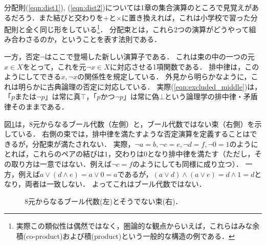 \documentclass[11pt,a4paper, dvipdfmx]{jsarticle}
\begin{document}
分配則(\ref{eqn:dist1}), (\ref{eqn:dist2})については1章の集合演算のところで見覚えがあるだろう．また結びと交わりを$+$と$\times$に置き換えれば，これは小学校で習った分配則と全く同じ形をしている\footnote{実際この類似性は偶然ではなく，圏論的な観点からいえば，これらはみな余積(co-product)および積(product)という一般的な構造の例である．}．
分配束とは，これら2つの演算がどうやって組み合わさるのか，ということを表す法則である．

一方，否定$\neg$はここで登場した新しい演算子である．
これは束の中の一つの元$x \in X$をとって，これを元$\neg x \in X$に対応させる1項関数である．
排中律は，このようにしてできる$x, \neg x$の関係性を規定している．
外見から明らかなように，これは明らかに古典論理の否定に対応している．
実際(\ref{eqn:excluded_middle})は，「$p$または$\neg p$」は常に真$\top$，「$p$かつ$\neg p$」は常に偽$\bot$という論理学の排中律・矛盾律そのままである．


図\ref{fig:8bool}は，8元からなるブール代数（左側）と，ブール代数ではない束（右側）を示している．
右側の束では，排中律を満たすような否定演算を定義することはできるが，分配束が満たされない．
実際，$\neg a = b, \neg c = e, \neg d =f, \neg 0 = 1$のようにとれば，これらのペアの結びは$1$，交わりは$0$となり排中律を満たす（ただし，その取り方は一意ではない．例えば$\neg c = f$のようにしても同様に成り立つ）．
一方，例えば$a \vee (d \wedge e) = a \vee 0 = a$であるが，$(a \vee d) \wedge (a \vee e) = d \wedge 1 = d$となり，両者は一致しない．
よってこれはブール代数ではない．
\begin{figure}[h]
    \centering
    \caption{8元からなるブール代数(左)とそうでない束(右)．}
    \label{fig:8bool}
\end{figure}
\end{document}
